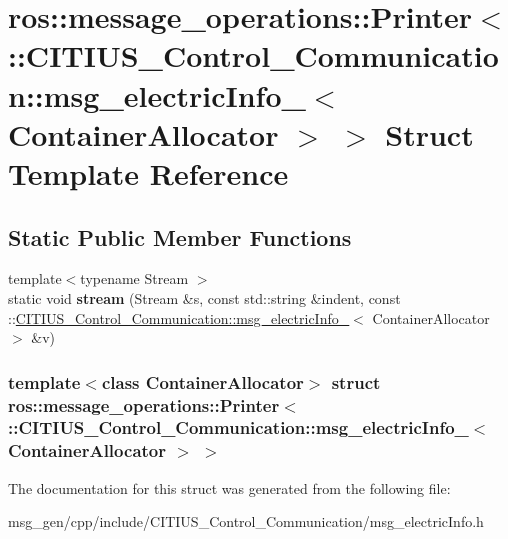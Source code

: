 \hypertarget{structros_1_1message__operations_1_1_printer_3_01_1_1_c_i_t_i_u_s___control___communication_1_1ma84b02a0643fb0b13c52a71b02f82c09}{\section{ros\-:\-:message\-\_\-operations\-:\-:\-Printer$<$ \-:\-:\-C\-I\-T\-I\-U\-S\-\_\-\-Control\-\_\-\-Communication\-:\-:msg\-\_\-electric\-Info\-\_\-$<$ \-Container\-Allocator $>$ $>$ \-Struct \-Template \-Reference}
\label{structros_1_1message__operations_1_1_printer_3_01_1_1_c_i_t_i_u_s___control___communication_1_1ma84b02a0643fb0b13c52a71b02f82c09}
}
\subsection*{\-Static \-Public \-Member \-Functions}
\begin{DoxyCompactItemize}
\item 
\hypertarget{structros_1_1message__operations_1_1_printer_3_01_1_1_c_i_t_i_u_s___control___communication_1_1ma84b02a0643fb0b13c52a71b02f82c09_a0f434bcd3c6a9961ab31507803237971}{{\footnotesize template$<$typename Stream $>$ }\\static void {\bfseries stream} (\-Stream \&s, const std\-::string \&indent, const \-::\hyperlink{struct_c_i_t_i_u_s___control___communication_1_1msg__electric_info__}{\-C\-I\-T\-I\-U\-S\-\_\-\-Control\-\_\-\-Communication\-::msg\-\_\-electric\-Info\-\_\-}$<$ \-Container\-Allocator $>$ \&v)}\label{structros_1_1message__operations_1_1_printer_3_01_1_1_c_i_t_i_u_s___control___communication_1_1ma84b02a0643fb0b13c52a71b02f82c09_a0f434bcd3c6a9961ab31507803237971}

\end{DoxyCompactItemize}
\subsubsection*{template$<$class Container\-Allocator$>$ struct ros\-::message\-\_\-operations\-::\-Printer$<$ \-::\-C\-I\-T\-I\-U\-S\-\_\-\-Control\-\_\-\-Communication\-::msg\-\_\-electric\-Info\-\_\-$<$ Container\-Allocator $>$ $>$}



\-The documentation for this struct was generated from the following file\-:\begin{DoxyCompactItemize}
\item 
msg\-\_\-gen/cpp/include/\-C\-I\-T\-I\-U\-S\-\_\-\-Control\-\_\-\-Communication/msg\-\_\-electric\-Info.\-h\end{DoxyCompactItemize}
